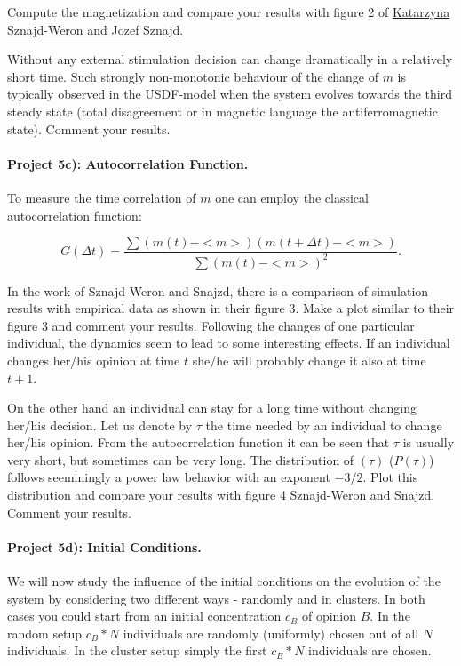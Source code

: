 \documentclass[%
oneside,                 %
final,                   %
10pt]{article}
\begin{document}
Compute the magnetization and compare your results with figure 2 of \href{{https://arxiv.org/abs/cond-mat/0101130}}{Katarzyna Sznajd-Weron and
Jozef Sznajd}.

Without any external stimulation decision can change
dramatically in a relatively short time.
Such strongly non-monotonic behaviour of the change of $m$
is typically observed in the USDF-model when the system evolves
towards the third steady state (total disagreement or in magnetic
language the antiferromagnetic state). Comment your results.


\paragraph{Project 5c): Autocorrelation Function.}
To measure the time correlation of $m$ one can employ the
classical autocorrelation function:

\begin{equation}
G(\Delta t) = \frac
{\sum \left( m(t)-<m>\right) \left( m(t+ \Delta t)- <m>\right)}
{\sum (m(t)-<m>)^2}.
\end{equation}

In the work of Sznajd-Weron and Snajzd, there is a comparison of
simulation results with empirical data as shown in their figure 3. Make a plot similar to their figure 3 and comment your results. 
Following the changes of one particular individual, the dynamics seem to lead to some interesting effects. If an individual changes her/his opinion at time $t$ she/he will probably
change it also at time $t+1$.

 On the other hand
an individual can stay for a long time without changing her/his decision.
Let us denote by $\tau$ the time needed by an individual to change  her/his
opinion. From the autocorrelation function  it can be seen that $\tau$ is usually very short,
but sometimes can be very long. The distribution of $(\tau)$ ($P(\tau)$)
follows seeminingly a power law behavior
with an exponent $-3/2$. Plot this distribution and compare your results with
figure 4 Sznajd-Weron and Snajzd. Comment your results.





\paragraph{Project 5d): Initial Conditions.}
We will now study the influence of the initial conditions on the
evolution of the system by considering  two different ways -
randomly and in clusters.  In both cases you could start from an initial
concentration $c_B$ of opinion $B$.  In the random setup $c_B*N$
individuals are randomly (uniformly) chosen out of all $N$
individuals. In the cluster setup simply the first $c_B*N$ individuals
are chosen.
\end{document}
